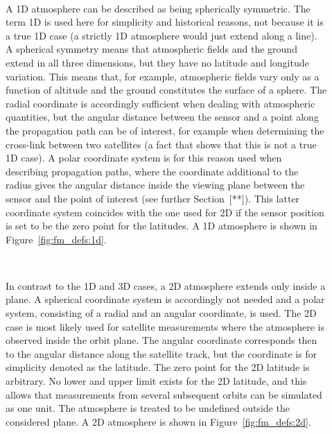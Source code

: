 \begin{description}
\item[\,\,\,] A 1D atmosphere can be described as being
  spherically symmetric. The term 1D is used here for simplicity and
  historical reasons, not because it is a true 1D case (a strictly 1D
  atmosphere would just extend along a line). A spherical symmetry
  means that atmospheric fields and the ground extend in all three
  dimensions, but they have no latitude and longitude variation. This
  means that, for example, atmospheric fields vary only as a function
  of altitude and the ground constitutes the surface of a sphere. The
  radial coordinate is accordingly sufficient when dealing with
  atmospheric quantities, but the angular distance between the sensor
  and a point along the propagation path can be of interest, for
  example when determining the cross-link between two satellites (a
  fact that shows that this is not a true 1D case). A polar coordinate
  system is for this reason used when describing propagation paths,
  where the coordinate additional to the radius gives the angular
  distance inside the viewing plane between the sensor and the point
  of interest (see further Section~[**]). This latter coordinate
  system coincides with the one used for 2D if the sensor position
  is set to be the zero point for the latitudes. A 1D atmosphere is shown
  in Figure~\ref{fig:fm_defs:1d}.
  
\item[\,\,\,] In contrast to the 1D and 3D cases, a 2D
  atmosphere extends only inside a plane. A spherical coordinate
  system is accordingly not needed and a polar system, consisting of a radial and an angular
  coordinate, is used. The 2D case is most likely used for satellite
  measurements where the atmosphere is observed inside the orbit
  plane. The angular coordinate corresponds then to the angular
  distance along the satellite track, but the coordinate is for
  simplicity denoted as the latitude. The zero point for the 2D
  latitude is arbitrary. No lower and upper limit exists for the 2D
  latitude, and this allows that measurements from several subsequent
  orbits can be simulated as one unit. The atmosphere is treated to be
  undefined outside the considered plane. A 2D atmosphere is shown in
  Figure~\ref{fig:fm_defs:2d}.

\end{description}

